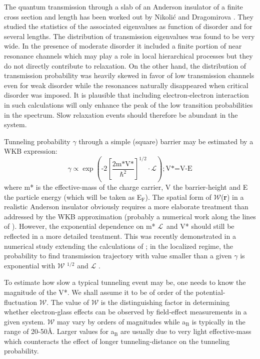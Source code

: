 \documentclass
[preprint,showpacs,byrevtex,10pt,twocolumn,tightenlines,prl,letterpaper]{revtex4}%
\begin{document}
The quantum transmission through a slab of an Anderson insulator of a finite
cross section and length has been worked out by Nikoli\'{c} and Dragomirova
\cite{44}. They studied the statistics of the associated eigenvalues as
function of disorder and for several lengths. The distribution of transmission
eigenvalues was found to be very wide. In the presence of moderate disorder it
included a finite portion of near resonance channels which may play a role in
local hierarchical processes but they do not directly contribute to
relaxation. On the other hand, the distribution of transmission probability
was heavily skewed in favor of low transmission channels \cite{43} even for
weak disorder while the resonances naturally disappeared when critical
disorder was imposed. It is plausible that including electron-electron
interaction in such calculations will only enhance the peak of the low
transition probabilities in the spectrum. Slow relaxation events should
therefore be abundant in the system.

Tunneling probability $\gamma$ through a simple (square) barrier may be
estimated by a WKB expression:%
\begin{equation}
\gamma\propto\exp\left(  \text{-2}\left[  \frac{\text{2m*V*}}{\hslash
^{\text{2}}}\right]  ^{\text{1/2}}\cdot\mathcal{L}\right)  ;\text{V*=V-E}%
\end{equation}
where m* is the effective-mass of the charge carrier, V the barrier-height and
E the particle energy (which will be taken as E$_{\text{F}}$). The spatial
form of $\mathcal{W}$(\textbf{r}) in a realistic Anderson insulator obviously
requires a more elaborate treatment than addressed by the WKB approximation
(probably a numerical work along the lines of \cite{42}). However, the
exponential dependence on m* $\mathcal{L}$\ and V* should still be reflected
in a more detailed treatment. This was recently demonstrated in a numerical
study extending the calculations of \cite{44}; in the localized regime, the
probability to find transmission trajectory with value smaller than a given
$\gamma$ is exponential with $\mathcal{W}$ $^{\text{1/2}}$ and $\mathcal{L}$
\cite{45}.

To estimate how slow a typical tunneling event may be, one needs to know the
magnitude of the V*. We shall assume it to be of order of the
potential-fluctuation $\mathcal{W}$. The value of $\mathcal{W}$ is the
distinguishing factor in determining whether electron-glass effects can be
observed by field-effect measurements in a given system. $\mathcal{W}$ may
vary by orders of magnitudes while a$_{\text{B}}$ is typically in the range of
20-50\AA . Larger values for a$_{\text{B}}$ are usually due to very light
effective-mass which counteracts the effect of longer tunneling-distance on
the tunneling probability.
\end{document}

